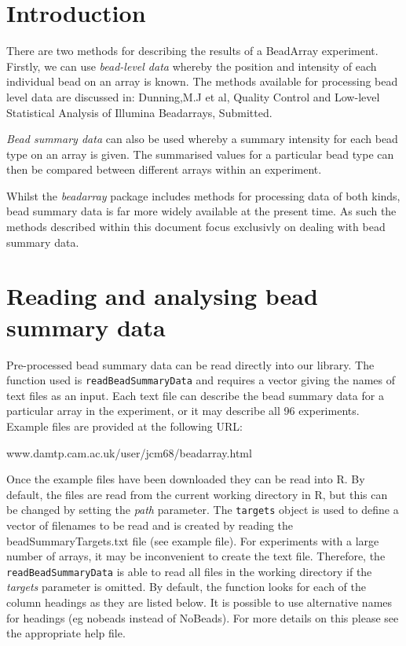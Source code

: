 \documentclass[a4paper]{article}
\newcommand{\Robject}[1]{{\texttt{#1}}}
\newcommand{\Rfunction}[1]{{\texttt{#1}}}
\newcommand{\Rpackage}[1]{{\textit{#1}}}
\newcommand{\Rfunarg}[1]{{\textit{#1}}}
\begin{document}
\section{Introduction}
\label{intro}

There are two methods for describing the results of a BeadArray experiment. Firstly, we can use \emph{bead-level data} whereby the position and intensity of each individual bead on an array is known. The methods available for processing bead level data are discussed in: Dunning,M.J et al, Quality Control and Low-level Statistical Analysis of Illumina Beadarrays, Submitted.

\emph{Bead summary data} can also be used whereby a summary intensity for each bead type on an array is given. The summarised values for a particular bead type can then be compared 
between different arrays within an experiment.

Whilst the \Rpackage{beadarray} package includes methods for processing data of both kinds, bead summary data is far more widely available at the present time.  As such the methods described within this document focus exclusivly on dealing with bead summary data.

\section{Reading and analysing bead summary data}

Pre-processed bead summary data can be read directly into our library. The function used is \Rfunction{readBeadSummaryData} and requires a vector giving the names of text files as an input. Each text file can describe the bead summary data for a particular array in the experiment, or it may describe all 96 experiments. Example files are provided at the following URL: 

 www.damtp.cam.ac.uk/user/jcm68/beadarray.html

Once the example files have been downloaded they can be read into {\sf R}. By default, the files are read from the current working directory in R, but this can be changed by setting the \Rfunarg{path} parameter. The \Robject{targets} object is used to define a vector of filenames to be read and is created by reading the beadSummaryTargets.txt file (see example file). For experiments with a large number of arrays, it may be inconvenient to create the text file. Therefore, the \Rfunction{readBeadSummaryData} is able to read all files in the working directory if the \Rfunarg{targets} parameter is omitted. By default, the function looks for each of the column headings as they are listed below. It is possible to use alternative names for headings (eg nobeads instead of NoBeads). For more details on this please see the appropriate help file.
\end{document}
